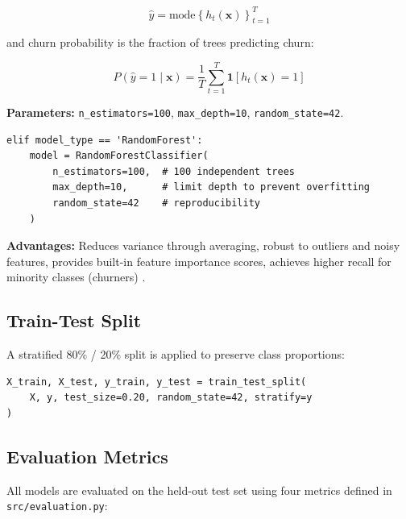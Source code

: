 \documentclass[12pt, a4paper]{article}
\begin{document}
\begin{equation}
    \hat{y} = \text{mode}\!\left\{h_t(\mathbf{x})\right\}_{t=1}^{T}
\end{equation}

and churn probability is the fraction of trees predicting churn:

\begin{equation}
    P(\hat{y}=1 \mid \mathbf{x}) = \frac{1}{T}\sum_{t=1}^{T} \mathbf{1}[h_t(\mathbf{x}) = 1]
\end{equation}

\noindent\textbf{Parameters:} \texttt{n\_estimators=100}, \texttt{max\_depth=10},
\texttt{random\_state=42}.

\begin{lstlisting}[caption={Random Forest instantiation — src/pipeline.py}, label={lst:rf}]
elif model_type == 'RandomForest':
    model = RandomForestClassifier(
        n_estimators=100,  # 100 independent trees
        max_depth=10,      # limit depth to prevent overfitting
        random_state=42    # reproducibility
    )
\end{lstlisting}

\textbf{Advantages:} Reduces variance through averaging, robust to outliers
and noisy features, provides built-in feature importance scores, achieves
higher recall for minority classes (churners) \cite{perianez2016}.

\subsection{Train-Test Split}

A stratified 80\% / 20\% split is applied to preserve class proportions:

\begin{lstlisting}[caption={Stratified train-test split}, label={lst:split}]
X_train, X_test, y_train, y_test = train_test_split(
    X, y, test_size=0.20, random_state=42, stratify=y
)
\end{lstlisting}

\subsection{Evaluation Metrics}

All models are evaluated on the held-out test set using four metrics
defined in \texttt{src/evaluation.py}:
\end{document}
